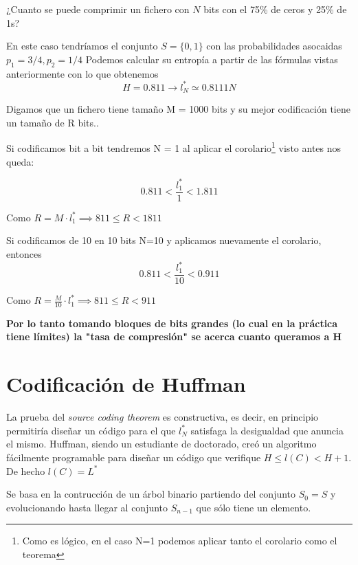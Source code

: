 \begin{example}
 ¿Cuanto se puede comprimir un fichero con $N$ bits con el 75\% de ceros y 25\% de 1s?

 	En este caso tendríamos el conjunto $S= \{0,1\}$ con las probabilidades asocaidas $ p_1 = 3/4, p_2 = 1/4$
 	Podemos calcular su entropía a partir de las fórmulas vistas anteriormente con lo que obtenemos
 	\[H = 0.811 \rightarrow  l^*_N \simeq 0.8111 N \]

	Digamos que un fichero tiene tamaño M = 1000 bits y su mejor codificación tiene un tamaño de R bits..

	Si codificamos bit a bit tendremos N = 1 al aplicar el corolario\footnote{Como es lógico, en el caso N=1 podemos aplicar tanto el corolario como el teorema} visto antes nos queda:

	$$0.811 < \frac{l^{*}_1}{1} < 1.811$$

	Como $R = M \cdot l^{*}_1 \implies 811 \leq R < 1811$

	Si codificamos de 10 en 10 bits N=10 y aplicamos nuevamente el corolario, entonces
	$$0.811 < \frac{l^{*}_1}{10} < 0.911$$

	Como $R = \frac{M}{10} \cdot l^{*}_1 \implies 811 \leq R < 911$

	\textbf{Por lo tanto tomando bloques de bits grandes (lo cual en la práctica tiene límites) la "tasa de compresión" se acerca cuanto queramos a H}
\end{example}


\section{Codificación de Huffman}

La prueba del \textit{source coding theorem} es constructiva, es decir, en principio permitiría diseñar un código para el que $l^*_N$ satisfaga la desigualdad que anuncia el mismo. Huffman, siendo un estudiante de doctorado, creó un algoritmo fácilmente programable para diseñar un código que verifique $H \leq l(C) < H +1$. De hecho $l(C) = L^{*}$

Se basa en la contrucción de un árbol binario partiendo del conjunto $S_0 = S$ y evolucionando hasta llegar al conjunto $S_{n-1}$ que sólo tiene un elemento.

